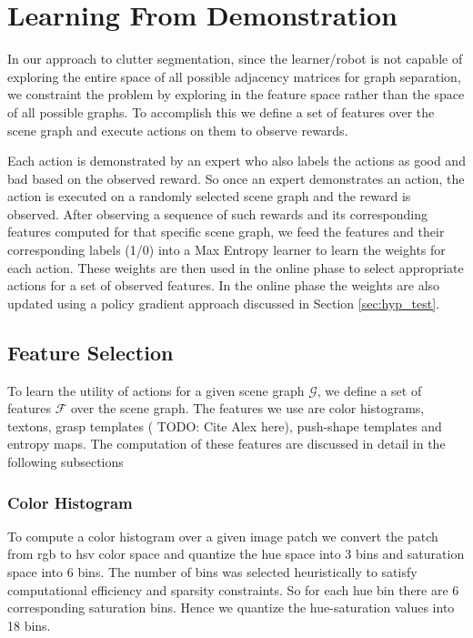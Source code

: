 \section{Learning From Demonstration}
\label{sec:lfd}
In our approach to clutter segmentation, since the learner/robot is not capable of exploring the entire space of all possible adjacency matrices for graph separation, we constraint the problem by exploring in the feature space rather than the space of all possible graphs. To accomplish this we define a set of features over the scene graph and execute actions on them to observe rewards. 

Each action is demonstrated by an expert who also labels the actions as good and bad based on the observed reward. So once an expert demonstrates an action, the action is executed on a randomly selected scene graph and the reward is observed. After observing a sequence of such rewards and its corresponding features computed for that specific scene graph, we feed the features and their corresponding labels (1/0) into a Max Entropy learner to learn the weights for each action. These weights are then used in the online phase to select appropriate actions for a set of observed features. In the online phase the weights are also updated using a policy gradient approach discussed in Section \ref{sec:hyp_test}.

\subsection{Feature Selection}
To learn the utility of actions for a given scene graph $\mathcal{G}$, we define a set of features $\mathcal{F}$ over the scene graph. The features we use are color histograms, textons, grasp templates (\cite{Javidi12_Journal} TODO: Cite Alex here), push-shape templates and entropy maps. The computation of these features are discussed in detail in the following subsections

\subsubsection{Color Histogram}
To compute a color histogram over a given image patch we convert the patch from rgb to hsv color space and quantize the hue space into 3 bins and saturation space into 6 bins. The number of bins was selected heuristically to satisfy computational efficiency and sparsity constraints. So for each hue bin there are 6 corresponding saturation bins. Hence we quantize the hue-saturation values into 18 bins.

